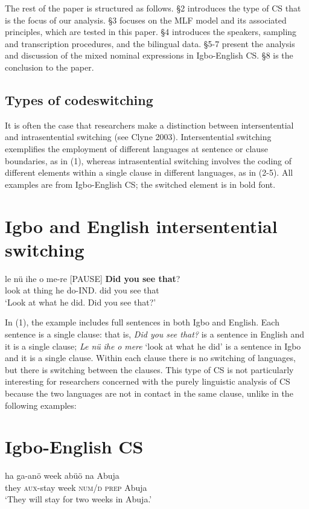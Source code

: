\documentclass[output=paper]{langsci/langscibook}
\begin{document}
The rest of the paper is structured as follows. §2 introduces the type of CS that is the focus of our analysis. §3 focuses on the MLF model and its associated principles, which are tested in this paper. §4 introduces the speakers, sampling and transcription procedures, and the bilingual data. §5-7 present the analysis and discussion of the mixed nominal expressions in Igbo-English CS. §8 is the conclusion to the paper.  

\section{ Types of codeswitching}

It is often the case that researchers make a distinction between intersentential and intrasentential switching (see Clyne 2003). Intersentential switching exemplifies the employment of different languages at sentence or clause boundaries, as in (1), whereas intrasentential switching involves the coding of different elements within a single clause in different languages, as in (2-5). All examples are from Igbo-English CS; the switched element is in bold font.

\chapter[Igbo and English intersentential switching]{Igbo and English intersentential switching\footnotemark{}}
\gll le    nü  ihe  o   me-re    [PAUSE] \textbf{D}\textbf{id you see that}?\\
     look  at  thing  he\textsubscript{   }do-IND.                did  you see that\\
\glt ‘Look at what he did. Did you see that?’
\z

In (1), the example includes full sentences in both Igbo and English. Each sentence is a single clause: that is, \textit{Did you see that? }is a sentence in English and it is a single clause; \textit{Le n}\textit{ü}\textit{ ihe o }\textit{mere} ‘look at what he did’ is a sentence in Igbo and it is a single clause. Within each clause there is no switching of languages, but there is switching between the clauses. This type of CS is not particularly interesting for researchers concerned with the purely linguistic analysis of CS because the two languages are not in contact in the same clause, unlike in the following examples:

\chapter[Igbo{}-English CS]{Igbo-English \textsc{CS}}
\gll ha    ga-anö     week  abüö  na  Abuja\\
     they  \textsc{aux}{}-stay  week  \textsc{num/d}  \textsc{prep}\textsubscript{   }Abuja\\
\glt ‘They will stay for two weeks in Abuja.’
\z
\end{document}
